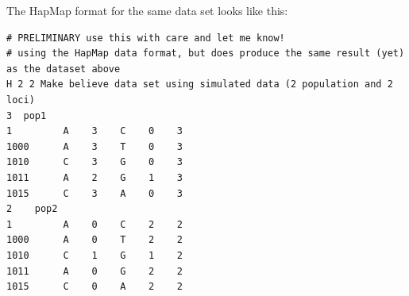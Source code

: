 The HapMap format for the same data set looks like this:

\begin{flushleft}
\begin{small}
\begin{tt}
\begin{verbatim}
# PRELIMINARY use this with care and let me know!
# using the HapMap data format, but does produce the same result (yet) as the dataset above
H 2 2 Make believe data set using simulated data (2 population and 2 loci) 
3  pop1 
1         A    3    C    0    3
1000      A    3    T    0    3
1010      C    3    G    0    3
1011      A    2    G    1    3
1015      C    3    A    0    3
2    pop2
1         A    0    C    2    2
1000      A    0    T    2    2
1010      C    1    G    1    2
1011      A    0    G    2    2
1015      C    0    A    2    2
\end{verbatim}
\end{tt}
\end{small}
\end{flushleft}
